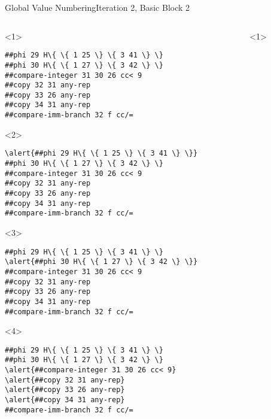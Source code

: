 \documentclass{beamer}
\begin{document}
\begin{frame}[fragile]{Global Value Numbering}{Iteration 2, Basic Block 2}
  \footnotesize
  \begin{columns}[t,onlytextwidth]
    \begin{column}[t]{.5\textwidth}
      \begin{onlyenv}<1>
        \begin{Verbatim}[frame=single,commandchars=\\\{\}]
##phi 29 H\{ \{ 1 25 \} \{ 3 41 \} \}
##phi 30 H\{ \{ 1 27 \} \{ 3 42 \} \}
##compare-integer 31 30 26 cc< 9
##copy 32 31 any-rep
##copy 33 26 any-rep
##copy 34 31 any-rep
##compare-imm-branch 32 f cc/=
        \end{Verbatim}
      \end{onlyenv}
      \begin{onlyenv}<2>
        \begin{Verbatim}[frame=single,commandchars=\\\{\}]
\alert{##phi 29 H\{ \{ 1 25 \} \{ 3 41 \} \}}
##phi 30 H\{ \{ 1 27 \} \{ 3 42 \} \}
##compare-integer 31 30 26 cc< 9
##copy 32 31 any-rep
##copy 33 26 any-rep
##copy 34 31 any-rep
##compare-imm-branch 32 f cc/=
        \end{Verbatim}
      \end{onlyenv}
      \begin{onlyenv}<3>
        \begin{Verbatim}[frame=single,commandchars=\\\{\}]
##phi 29 H\{ \{ 1 25 \} \{ 3 41 \} \}
\alert{##phi 30 H\{ \{ 1 27 \} \{ 3 42 \} \}}
##compare-integer 31 30 26 cc< 9
##copy 32 31 any-rep
##copy 33 26 any-rep
##copy 34 31 any-rep
##compare-imm-branch 32 f cc/=
        \end{Verbatim}
      \end{onlyenv}
      \begin{onlyenv}<4>
        \begin{Verbatim}[frame=single,commandchars=\\\{\}]
##phi 29 H\{ \{ 1 25 \} \{ 3 41 \} \}
##phi 30 H\{ \{ 1 27 \} \{ 3 42 \} \}
\alert{##compare-integer 31 30 26 cc< 9}
\alert{##copy 32 31 any-rep}
\alert{##copy 33 26 any-rep}
\alert{##copy 34 31 any-rep}
##compare-imm-branch 32 f cc/=
        \end{Verbatim}
      \end{onlyenv}
    \end{column}
    \begin{column}{.5\textwidth}
      \begin{onlyenv}<1>

\end{onlyenv}
\end{column}
\end{columns}
\end{frame}
\end{document}
